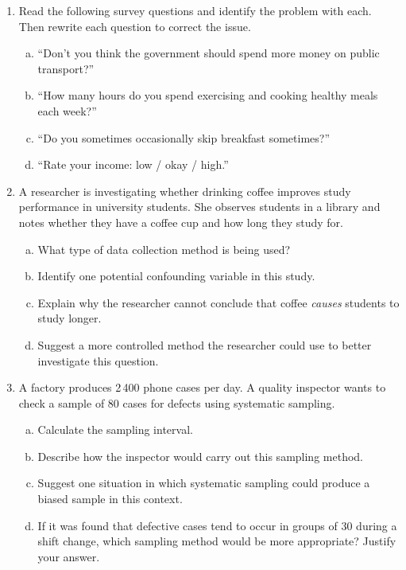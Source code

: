 \documentclass{article}
\begin{document}
\begin{enumerate}
  \item Read the following survey questions and identify the problem with each. Then rewrite
  each question to correct the issue.
  \begin{enumerate}[(a)]
    \item ``Don't you think the government should spend more money on public transport?''
    \item ``How many hours do you spend exercising and cooking healthy meals each week?''
    \item ``Do you sometimes occasionally skip breakfast sometimes?''
    \item ``Rate your income: low / okay / high.''
  \end{enumerate}

  \item A researcher is investigating whether drinking coffee improves study performance in
  university students. She observes students in a library and notes whether they have a coffee
  cup and how long they study for.
  \begin{enumerate}[(a)]
    \item What type of data collection method is being used?
    \item Identify one potential confounding variable in this study.
    \item Explain why the researcher cannot conclude that coffee \textit{causes} students to
    study longer.
    \item Suggest a more controlled method the researcher could use to better investigate this
    question.
  \end{enumerate}

  \item A factory produces 2\,400 phone cases per day. A quality inspector wants to check a
  sample of 80 cases for defects using systematic sampling.
  \begin{enumerate}[(a)]
    \item Calculate the sampling interval.
    \item Describe how the inspector would carry out this sampling method.
    \item Suggest one situation in which systematic sampling could produce a biased sample
    in this context.
    \item If it was found that defective cases tend to occur in groups of 30 during a shift
    change, which sampling method would be more appropriate? Justify your answer.
  \end{enumerate}


\end{enumerate}
\end{document}
